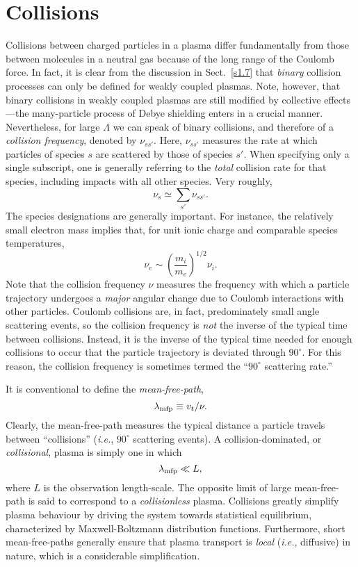 \section{Collisions}
Collisions between charged particles in a plasma differ fundamentally from
those between molecules in a neutral gas because of the long range of the
Coulomb force. In fact, it is clear from the discussion in Sect.~\ref{s1.7} that
{\em binary}\/ collision processes can only be defined for weakly coupled
plasmas. Note, however, that binary collisions in weakly coupled plasmas
are still modified by collective effects---the many-particle
process of Debye shielding enters in a crucial manner. Nevertheless, for
large ${\Lambda}$ we can speak of binary collisions, and therefore of
a {\em collision frequency}, denoted by $\nu_{ss'}$. Here,
$\nu_{ss'}$ measures the rate at which particles of species $s$ are scattered 
by those of species $s'$. When specifying only a single subscript, one is
generally referring to the {\em total}\/ collision rate for that species,
including impacts with all other species. Very roughly,
\begin{equation}
\nu_s \simeq \sum_{s'} \nu_{ss'}.
\end{equation}
The species designations are generally important. For instance,
the relatively small electron mass implies that, for unit ionic charge and
comparable species temperatures,
\begin{equation}
\nu_e \sim \left(\frac{m_i}{m_e}\right)^{1/2}\!\nu_i.
\end{equation}
Note that the collision frequency $\nu$ measures the frequency with which a
particle trajectory undergoes a {\em major}\/ angular change due to
Coulomb interactions with other particles. Coulomb collisions are, in fact,
predominately small angle scattering events, so the collision frequency
is {\em not}\/ the inverse of the typical time between collisions. Instead, it is
the inverse of the typical time needed for enough collisions to occur that the particle trajectory is deviated through $90^\circ$.
For this reason, the collision frequency is sometimes termed the ``$90^\circ$ scattering
rate.'' 

It is conventional to define the {\em mean-free-path},
\begin{equation}
\lambda_{\rm mfp} \equiv v_t/\nu.
\end{equation}
Clearly, the mean-free-path measures the typical distance a particle
travels between ``collisions'' ({\em i.e.},
$90^\circ$ scattering events). A collision-dominated, or {\em collisional},
plasma is simply one in which
\begin{equation}
\lambda_{\rm mfp} \ll L,
\end{equation}
where $L$ is the observation length-scale. The opposite limit of
large mean-free-path is said to correspond to a {\em collisionless}\/ plasma. 
Collisions greatly simplify plasma behaviour by driving the system towards
statistical equilibrium, characterized by Maxwell-Boltzmann distribution
functions. Furthermore, short mean-free-paths generally ensure that plasma
transport is {\em local}\/ ({\em i.e.}, diffusive) in nature, which is a considerable
simplification. 

